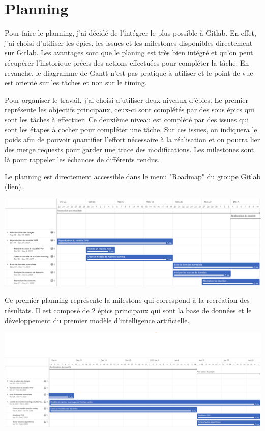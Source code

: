 \chapter{Planning}
\label{chap:planning}

Pour faire le planning, j'ai décidé de l'intégrer le plus possible à Gitlab. En effet, j'ai choisi d'utiliser les épics, les issues et les milestones disponibles directement sur Gitlab.
Les avantages sont que le planing est très bien intégré et qu'on peut récupérer l'historique précis des actions effectuées pour compléter la tâche.
En revanche, le diagramme de Gantt n'est pas pratique à utiliser et le point de vue est orienté sur les tâches et non sur le timing.

Pour organiser le travail, j'ai choisi d'utiliser deux niveaux d'épics. Le premier représente les objectifs principaux, ceux-ci sont complétés par des sous épics qui sont les tâches à effectuer.
Ce deuxième niveau est complété par des issues qui sont les étapes à cocher pour compléter une tâche. Sur ces issues, on indiquera le poids afin de pouvoir quantifier l'effort nécessaire à la réalisation et on pourra lier des merge requests pour garder une trace des modifications.
Les milestones sont là pour rappeler les échances de différents rendus.

Le planning est directement accessible dans le menu "Roadmap" du groupe Gitlab (\href{https://gitlab.forge.hefr.ch/groups/ps5-2223-fusionprediction/-/roadmap}{lien}).

\begin{center}
    \includegraphics[width=14cm]{img/planning_1.png}
\end{center}

Ce premier planning représente la milestone qui correspond à la recréation des résultats. Il est composé de 2 épics principaux qui sont la base de données et le développement du premier modèle d'intelligence artificielle.

\begin{center}
    \includegraphics[width=14cm]{img/planning_2.png}
\end{center}

